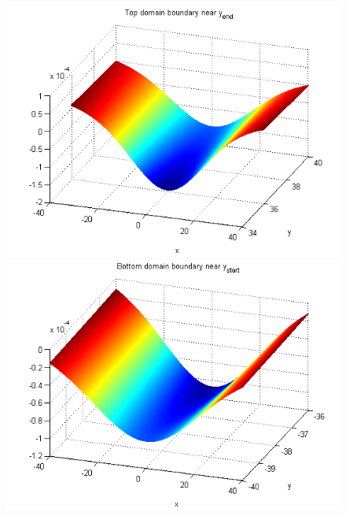 \documentclass[11pt,a4paper,twoside]{article}
\begin{document}
\begin{figure}[!htbp]
	\centering
	\begin{minipage}[b]{0.45\linewidth}
		
		\includegraphics[width=\linewidth]{Pictures/TopBoundary.png}
	\end{minipage}	
	\begin{minipage}[b]{0.45\linewidth}
		
		 \includegraphics[width=\linewidth]{Pictures/BottomBoundary.png}
	\end{minipage}
	\begin{minipage}[b]{0.45\linewidth}
		

\end{minipage}
\end{figure}
\end{document}
